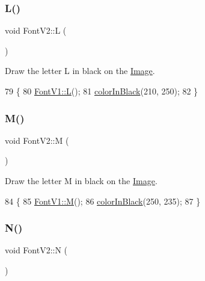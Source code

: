 \subsubsection{\texorpdfstring{L()}{L()}}
{\footnotesize\ttfamily void Font\+V2\+::L (\begin{DoxyParamCaption}{ }\end{DoxyParamCaption})}



Draw the letter L in black on the \mbox{\hyperlink{class_image}{Image}}. 


\begin{DoxyCode}
79                \{
80     \mbox{\hyperlink{class_font_v1_a17ba426bfb42af35ea882ab3beeba734}{FontV1::L}}();
81     \mbox{\hyperlink{class_font_v2_a04f2501961bc286ce70fbb6a840b0e8a}{colorInBlack}}(210, 250);
82 \}
\end{DoxyCode}
\mbox{\label{class_font_v2_a65ab055c8555447a542ed5c26ef925ee}} 
\subsubsection{\texorpdfstring{M()}{M()}}
{\footnotesize\ttfamily void Font\+V2\+::M (\begin{DoxyParamCaption}{ }\end{DoxyParamCaption})}



Draw the letter M in black on the \mbox{\hyperlink{class_image}{Image}}. 


\begin{DoxyCode}
84                \{
85     \mbox{\hyperlink{class_font_v1_a69afdf545ed6bccbb31efaef5d6d4219}{FontV1::M}}();
86     \mbox{\hyperlink{class_font_v2_a04f2501961bc286ce70fbb6a840b0e8a}{colorInBlack}}(250, 235);
87 \}
\end{DoxyCode}
\mbox{\label{class_font_v2_ab0f1cbe6375f24c45f6d9bd518165353}} 
\subsubsection{\texorpdfstring{N()}{N()}}
{\footnotesize\ttfamily void Font\+V2\+::N (\begin{DoxyParamCaption}{ }\end{DoxyParamCaption})}



